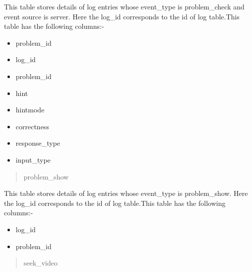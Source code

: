 \documentclass[a4paper,12pt,oneside]{sphinxmanual}
\begin{document}
\begin{DUlineblock}{0em}
\item[] This table stores details of log entries whose event\_type is problem\_check and event source is server.  Here the log\_id    corresponds  to the id of log table.This table has the following columns:-
\end{DUlineblock}
\begin{itemize}
\item {} 
problem\_id

\item {} 
log\_id

\item {} 
problem\_id

\item {} 
hint

\item {} 
hintmode

\item {} 
correctness

\item {} 
response\_type

\item {} 
input\_type

\end{itemize}
\begin{quote}\begin{description}
\item[{problem\_show}] \leavevmode
\end{description}\end{quote}

\begin{DUlineblock}{0em}
\item[] This table stores details of log entries whose event\_type is problem\_show.  Here the log\_id                 corresponds  to the id of log table.This table has the following columns:-
\end{DUlineblock}
\begin{itemize}
\item {} 
log\_id

\item {} 
problem\_id

\end{itemize}
\begin{quote}\begin{description}
\item[{seek\_video}] \leavevmode
\end{description}\end{quote}
\end{document}
